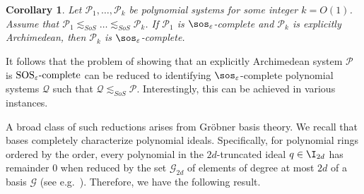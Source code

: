 \documentclass[11pt]{article}
\newtheorem{proposition}[theorem]{Proposition}
\newtheorem{corollary}[theorem]{Corollary}
\newcommand{\SOSe}{\rm{SOS}_\varepsilon\text{-complete}}
\begin{document}
\begin{corollary}\label{cor:completeness_inheritance}
    Let $\mathcal{P}_1, \dots, \mathcal{P}_k$ be polynomial systems for some integer $k = O(1)$. Assume that $\mathcal{P}_1 \lesssim_{SoS} \dots \lesssim_{SoS} \mathcal{P}_k$. If $\mathcal{P}_1$ is $\sos_{\varepsilon}$-complete and $\mathcal{P}_k$ is explicitly Archimedean, then $\mathcal{P}_k$ is $\sos_{\varepsilon}$-complete.
\end{corollary}


It follows that the problem of showing that an explicitly Archimedean system $\mathcal{P}$ is $\SOSe$ can be reduced to identifying $\sos_\varepsilon$-complete polynomial systems $\mathcal{Q}$ such that $\mathcal{Q} \lesssim_{SoS} \mathcal{P}$. Interestingly, this can be achieved in various instances.


A broad class of such reductions arises from Gröbner basis theory. We recall that \GB bases completely characterize polynomial ideals. Specifically, for polynomial rings ordered by the \emph{\grlexns} order, every polynomial in the $2d$-truncated ideal $q \in \I_{2d}$ has remainder 0 when reduced by the set $\mathcal{G}_{2d}$ of elements of degree at most $2d$ of a \GB basis $\mathcal{G}$ (see e.g.~\cite{Cox}). Therefore, we have the following result.
\end{document}
